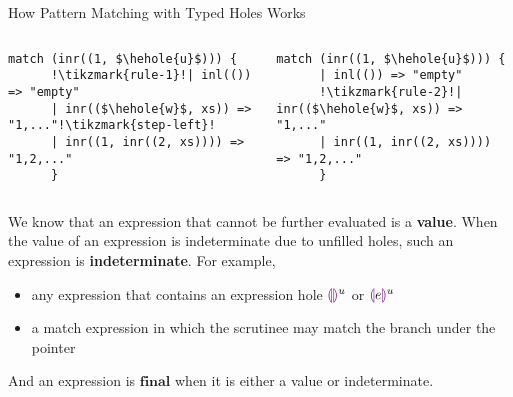 \documentclass[notheorems]{beamer}
\theoremstyle{slplain}
\numberwithin{thm}{section}
\newlength{\onecolwid}
\begin{document}
\begin{frame}[containsverbatim]
\begin{columns}[t]
\begin{column}{\onecolwid}
\begin{block}{How Pattern Matching with Typed Holes Works}
  \begin{columns}
    \begin{column}{0.5\textwidth}
    \begin{lstlisting}[basicstyle=\small,name=syntax 1,caption={Does Not Match},captionpos=b,escapechar=!,mathescape]
      match (inr((1, $\hehole{u}$))) {
      !\tikzmark{rule-1}!| inl(()) => "empty"
      | inr(($\hehole{w}$, xs)) => "1,..."!\tikzmark{step-left}!
      | inr((1, inr((2, xs)))) => "1,2,..."
      }
    \end{lstlisting}
    \end{column}
    \begin{column}{0.5\textwidth}
    \begin{lstlisting}[basicstyle=\small,name=syntax 2,caption={May Match},captionpos=b,escapechar=!,mathescape]
      match (inr((1, $\hehole{u}$))) {
      | inl(()) => "empty"
      !\tikzmark{rule-2}!| inr(($\hehole{w}$, xs)) => "1,..."
      | inr((1, inr((2, xs)))) => "1,2,..."
      }
    \end{lstlisting}
    \end{column}
  \end{columns}
  We know that an expression that cannot be further evaluated is a \textbf{value}.
  When the value of an expression is indeterminate due to unfilled holes, such an expression is \textbf{indeterminate}. For example,
  \begin{itemize}
    \item any expression that contains an expression hole $\textcolor{violet}{\llparenthesis}\textcolor{violet}{\rrparenthesis}^{u}$ or $\textcolor{violet}{\llparenthesis} e\textcolor{violet}{\rrparenthesis}^{u}$
    \item a match expression in which the scrutinee may match the branch under the pointer
  \end{itemize}
  And an expression is $\textbf{final}$ when it is either a value or indeterminate.
\end{block}


\end{column} %


\end{columns}
\end{frame}
\end{document}
